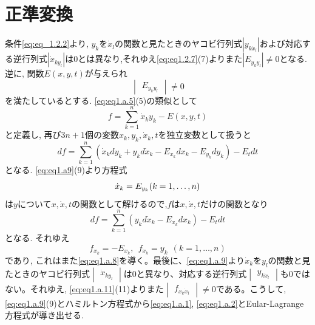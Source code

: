 \documentclass[dvipdfmx, leqno]{jsbook}
\begin{document}
\section{正準変換}
    条件\eqref{eq:eq_1.2.2}より, $y_k$を$\dot{x}_l$の関数と見たときのヤコビ行列式$|y_{k\dot{x}_l}|$および対応する逆行列式$|\dot{x}_{ky_l}|$は0とは異なり,それゆえ\eqref{eq:eq1.2.7}(7)よりまた$|E_{y_ky_l}|\neq 0$となる. 
    逆に, 関数$E(x,y,t)$が与えられ
\begin{equation} \label{eq:eqq1.a.9}
    \begin{vmatrix}E_{y_ky_l}\end{vmatrix}\neq 0
\end{equation}
    を満たしているとする. \eqref{eq:eq1.a.5}(5)の類似として
\begin{equation} \label{eq:eq.1.a.10}
    f= \sum_{k=1}^{n} \dot{x}_ky_k- E(x, y, t)
\end{equation}
    と定義し, 再び$3n+ 1$個の変数$x_k, y_k, \dot{x}_k, t$を独立変数として扱うと
\begin{equation}
    df = \sum_{k=1}^{n} (\dot{x}_k dy_k + y_k d\dot{x}_k - E_{x_k} dx_k - E_{y_k} dy_k) - E_t dt
\end{equation}
    となる. \eqref{eq:eq1.a9}(9)より方程式
\begin{equation}
    \dot{x}_k= E_{y_k} \\ (k= 1, \dots, n)
\end{equation}
    は$y$について$x, \dot{x}, t$の関数として解けるので,$f$は$x, \dot{x}, t$だけの関数となり
\begin{equation}
    df= \sum_{k= 1}^{n} (y_k d\dot{x}_k- E_{x_k} dx_k)- E_t dt
\end{equation}
    となる. それゆえ
\begin{equation}
    f_{x_k}= -E_{x_k},\ \ f_{\dot{x}_k}= y_k \ \ (k= 1, \dots, n)
\end{equation}
    であり, これはまた\eqref{eq:eq1.a.8}を導く。最後に、\eqref{eq:eq1.a.9}より$\dot{x}_k$を$y_l$の関数と見たときのヤコビ行列式$\begin{vmatrix}\dot{x}_{ky_l}\end{vmatrix}$は0と異なり、対応する逆行列式$\begin{vmatrix}y_{k\dot{x}_l}\end{vmatrix}$も0ではない。それゆえ, \eqref{eq:eq1.a.11}(11)よりまた$\begin{vmatrix}f_{\dot{x}_k \dot{x}_l}\end{vmatrix}\neq 0$である。こうして, \eqref{eq:eq1.a.9}(9)とハミルトン方程式から\eqref{eq:eq1.a.1}, \eqref{eq:eq1.a.2}とEular-Lagrange方程式が導き出せる.
\end{document}
